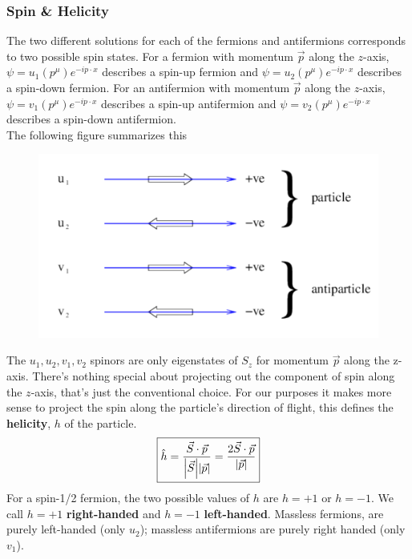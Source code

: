 \documentclass{book}
\theoremstyle{definition}
\newcommand{\f}[2]{\frac{#1}{#2}}
\begin{document}
\subsubsection{Spin \& Helicity}



The two different solutions for each of the fermions and antifermions corresponds to two possible spin states. For a fermion with momentum $\vec{p}$ along the $z$-axis, $\psi = u_1(p^\mu)e^{−ip\cdot x}$ describes a spin-up fermion and $\psi = u_2(p^\mu)e^{−ip\cdot x}$ describes a spin-down fermion. For
an antifermion with momentum $\vec{p}$ along the $z$-axis, $\psi = v_1(p^\mu)e^{−ip\cdot x}$ describes a spin-up
antifermion and $\psi = v_2(p^\mu)e^{−ip\cdot x}$ describes a spin-down antifermion.\\

The following figure summarizes this
\begin{figure}[!htb]
	\centering
	\includegraphics[scale=0.3]{fermions}
\end{figure}

The $u_1, u_2, v_1, v_2$ spinors are only eigenstates of $S_z$ for momentum $\vec{p}$ along the z-axis. There’s nothing special about projecting out the component of spin along the $z$-axis,
that's just the conventional choice. For our purposes it makes more sense to project the spin along the particle’s direction of flight, this defines the \textbf{helicity}, $h$ of the particle.
\begin{align}
\boxed{\hat{h} = \f{\vec{S} \cdot \vec{p}}{\abs{\vec{S}}\abs{\vec{p}}} = \f{2 \vec{S}\cdot\vec{p}}{\abs{\vec{p}}}}
\end{align}
For a spin-1/2 fermion, the two possible values of $h$ are $h = +1$ or $h = −1$. We call $h = +1$ \textbf{right-handed} and $h = −1$ \textbf{left-handed}. Massless fermions, are purely left-handed (only $u_2$); massless antifermions are purely right handed (only $v_1$).
\end{document}
